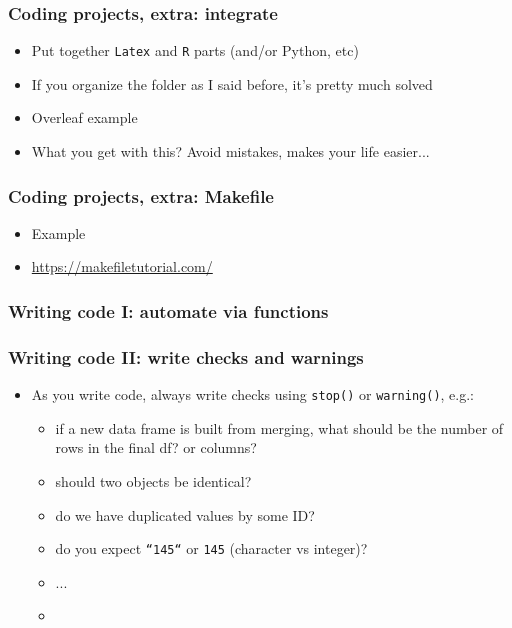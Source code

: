 \documentclass[aspectratio=43]{beamer}
\begin{document}
\begin{frame}
\frametitle{Coding projects, extra: integrate}
\centering

\begin{itemize}
  \item Put together \texttt{Latex} and \texttt{R} parts (and/or Python, etc)
  \item If you organize the folder as I said before, it's pretty much solved
  \item Overleaf example
  \item What you get with this? Avoid mistakes, makes your life easier...
\end{itemize}

\end{frame}

\begin{frame}
\frametitle{Coding projects, extra: Makefile}
\centering

\begin{itemize}
  \item Example
  \item \href{https://makefiletutorial.com/}{https://makefiletutorial.com/}
\end{itemize}

\end{frame}

\begin{frame}
\frametitle{Writing code I: automate via functions}
\centering



\end{frame}

\begin{frame}
\frametitle{Writing code II: write checks and warnings}
\centering

\begin{itemize}
  \item As you write code, always write checks using \texttt{stop()} or \texttt{warning()}, e.g.:
  \begin{itemize}
    \item if a new data frame is built from merging, what should be the number of rows in the final df? or columns?
    \item should two objects be identical?
    \item do we have duplicated values by some ID?
    \item do you expect \texttt{``145``} or \texttt{145} (character vs integer)?
    \item ...
    \item[]
  \end{itemize}
\end{itemize}

\end{frame}
\end{document}
